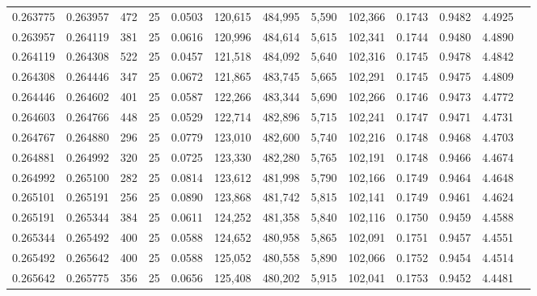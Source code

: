 \begin{tabular}{rrrrrrrrrrrrr}
0.263775 & 0.263957 &   472 &  25 &                                     0.0503 & 120,615 & 484,995 &   5,590 & 102,366 & 0.1743 & 0.9482 & 4.4925 \\
0.263957 & 0.264119 &   381 &  25 &                                     0.0616 & 120,996 & 484,614 &   5,615 & 102,341 & 0.1744 & 0.9480 & 4.4890 \\
0.264119 & 0.264308 &   522 &  25 &                                     0.0457 & 121,518 & 484,092 &   5,640 & 102,316 & 0.1745 & 0.9478 & 4.4842 \\
0.264308 & 0.264446 &   347 &  25 &                                     0.0672 & 121,865 & 483,745 &   5,665 & 102,291 & 0.1745 & 0.9475 & 4.4809 \\
0.264446 & 0.264602 &   401 &  25 &                                     0.0587 & 122,266 & 483,344 &   5,690 & 102,266 & 0.1746 & 0.9473 & 4.4772 \\
0.264603 & 0.264766 &   448 &  25 &                                     0.0529 & 122,714 & 482,896 &   5,715 & 102,241 & 0.1747 & 0.9471 & 4.4731 \\
0.264767 & 0.264880 &   296 &  25 &                                     0.0779 & 123,010 & 482,600 &   5,740 & 102,216 & 0.1748 & 0.9468 & 4.4703 \\
0.264881 & 0.264992 &   320 &  25 &                                     0.0725 & 123,330 & 482,280 &   5,765 & 102,191 & 0.1748 & 0.9466 & 4.4674 \\
0.264992 & 0.265100 &   282 &  25 &                                     0.0814 & 123,612 & 481,998 &   5,790 & 102,166 & 0.1749 & 0.9464 & 4.4648 \\
0.265101 & 0.265191 &   256 &  25 &                                     0.0890 & 123,868 & 481,742 &   5,815 & 102,141 & 0.1749 & 0.9461 & 4.4624 \\
0.265191 & 0.265344 &   384 &  25 &                                     0.0611 & 124,252 & 481,358 &   5,840 & 102,116 & 0.1750 & 0.9459 & 4.4588 \\
0.265344 & 0.265492 &   400 &  25 &                                     0.0588 & 124,652 & 480,958 &   5,865 & 102,091 & 0.1751 & 0.9457 & 4.4551 \\
0.265492 & 0.265642 &   400 &  25 &                                     0.0588 & 125,052 & 480,558 &   5,890 & 102,066 & 0.1752 & 0.9454 & 4.4514 \\
0.265642 & 0.265775 &   356 &  25 &                                     0.0656 & 125,408 & 480,202 &   5,915 & 102,041 & 0.1753 & 0.9452 & 4.4481 \\

\end{tabular}

